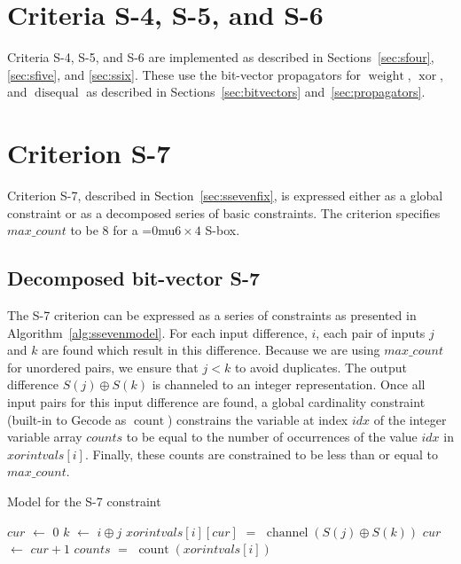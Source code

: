 \documentclass[a4paper,10pt,twoside,openright]{book}
\newcommand*\sixbyfour{\begingroup\medmuskip=0mu\relax$6 \times 4$\endgroup}
\newcommand*\Let[2]{\State #1 $\gets$ #2}
\newcommand*\Equivalent[2]{\State #1 $=$ #2}
\DeclareMathOperator{\weight}{weight}
\DeclareMathOperator{\disequal}{disequal}
\DeclareMathOperator{\funccount}{count}
\DeclareMathOperator{\xor}{xor}
\DeclareMathOperator{\channel}{channel}
\begin{document}
\section{Criteria S-4, S-5, and S-6}
\label{sec:models4}
Criteria S-4, S-5, and S-6 are implemented 
as described in Sections~\ref{sec:sfour}, \ref{sec:sfive}, and \ref{sec:ssix}.
These use the bit-vector propagators for $\weight$, $\xor$, and $\disequal$
as described in Sections~\ref{sec:bitvectors} and~\ref{sec:propagators}.

\section{Criterion S-7}
Criterion S-7, described in Section~\ref{sec:ssevenfix},
is expressed either as a global constraint 
or as a decomposed series of basic constraints.
The criterion specifies $\mathit{max\_count}$ to be $8$ for a \sixbyfour{} S-box.

\subsection{Decomposed bit-vector S-7}
\label{sec:bitvecssevendecomp}
The S-7 criterion can be expressed as a series of constraints as presented in
Algorithm~\ref{alg:ssevenmodel}. 
For each input difference, $i$, each pair of inputs $j$ and $k$ are found which 
result in this difference. Because we are using $\mathit{max\_count}$ for 
unordered pairs, we ensure that $j < k$ to avoid duplicates. 
The output difference $S(j) \oplus S(k)$ is channeled to an integer representation.
Once all input pairs for this input difference are found, 
a global cardinality constraint (built-in to Gecode as $\funccount$)
constrains the variable at index $\mathit{idx}$ of 
the integer variable array $\mathit{counts}$ to be equal 
to the number of occurrences of the value $\mathit{idx}$ 
in $\mathit{xorintvals}[i]$.
Finally, these counts are constrained to be less than or equal to
$\mathit{max\_count}$.
\begin{algorithm}
    \caption{Model for the S-7 constraint}
    \label{alg:ssevenmodel}
    \begin{algorithmic}
            \Let{$\mathit{cur}$}{$0$}
                \Let{$k$}{$i \oplus j$}
                    \Equivalent{$\mathit{xorintvals}[i][cur]$}{$\channel(S(j) \oplus S(k))$}
                    \Let{$\mathit{cur}$}{$\mathit{cur} + 1$}
                \EndIf
            \EndFor
            \Equivalent{$\mathit{counts}$}{$\funccount(\mathit{xorintvals}[i])$}
        \EndFor
    \end{algorithmic}
\end{algorithm}
\end{document}
